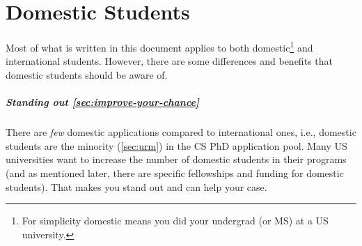 \documentclass[oneside,11pt,dvipsnames]{book}
\begin{document}


\chapter{Domestic Students}\label{sec:domestic-students}

Most of what is written in this document applies to both domestic\footnote{For simplicity domestic means you did your undergrad (or MS) at a US university.} and international students.  However, there are some differences and benefits that domestic students should be aware of.

\paragraph{Standing out \autoref{sec:improve-your-chance}} There are \emph{few} domestic applications compared to international ones, i.e., domestic students are the minority (\autoref{sec:urm}) in the CS PhD application pool. Many US universities want to increase the number of domestic students in their programs (and as mentioned later, there are specific fellowships and funding for domestic students).
That makes you stand out and can help your case.
\end{document}
